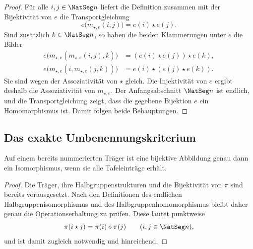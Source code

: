 \documentclass[main.tex]{subfiles}
\begin{document}
\begin{proof}
Für alle \(i,j\in\NatSeg n\) liefert die Definition zusammen mit der
Bijektivität von \(e\) die Transportgleichung
\[
  e\bigl(m_{\star,e}(i,j)\bigr)=e(i)\star e(j).
\]
Sind zusätzlich \(k\in\NatSeg n\), so haben die beiden Klammerungen unter
\(e\) die Bilder
\[
\begin{aligned}
e\bigl(m_{\star,e}(m_{\star,e}(i,j),k)\bigr)
  &=(e(i)\star e(j))\star e(k),\\
e\bigl(m_{\star,e}(i,m_{\star,e}(j,k))\bigr)
  &=e(i)\star(e(j)\star e(k)).
\end{aligned}
\]
Sie sind wegen der Assoziativität von \(\star\) gleich.  Die Injektivität
von \(e\) ergibt deshalb die Assoziativität von \(m_{\star,e}\).  Der
Anfangsabschnitt \(\NatSeg n\) ist endlich, und die Transportgleichung zeigt,
dass die gegebene Bijektion \(e\) ein Homomorphismus ist.  Damit folgen beide
Behauptungen.
\end{proof}

\subsection{Das exakte Umbenennungskriterium}

Auf einem bereits nummerierten Träger ist eine bijektive Abbildung genau
dann ein Isomorphismus, wenn sie alle Tafeleinträge erhält.

\begin{proof}
Die Träger, ihre Halbgruppenstrukturen und die Bijektivität von \(\pi\) sind
bereits vorausgesetzt.  Nach den Definitionen des endlichen
Halbgruppenisomorphismus und des Halbgruppenhomomorphismus bleibt daher genau
die Operationserhaltung zu prüfen.  Diese lautet punktweise
\[
  \pi(i\star j)=\pi(i)\diamond\pi(j)
  \qquad(i,j\in\NatSeg n),
\]
und ist damit zugleich notwendig und hinreichend.
\end{proof}
\end{document}
